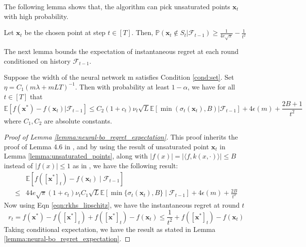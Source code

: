 The following lemma shows that, the algorithm can pick unsaturated points $\mathbf{x}_t$ with high probability. 
\begin{lemma}
\label{lemma:unsaturated_points}

Let $\mathbf{x}_t$ be the chosen point at step $t \in [T]$. Then, $\mathbb{P}(\mathbf{x}_t \not\in S_t \lvert \mathcal{F}_{t-1}) \geq \frac{1}{4e\sqrt{\pi}} - \frac{1}{t^2}$
\end{lemma}

The next lemma bounds the expectation of instantaneous regret at each round conditioned on history $\mathcal{F}_{t-1}$.

\begin{lemma}
\label{lemma:neural-bo_regret_expectation}
Suppose the width of the neural network m satisfies Condition \ref{cond:set}. Set $\eta = C_1(m\lambda + mLT)^{-1}$. Then with probability at least $1- \alpha$, we have for all $t \in [T]$ that
\begin{equation*}
\mathbb{E}[f(\mathbf{x}^*) - f(\mathbf{x}_t) \lvert \mathcal{F}_{t-1}] \leq C_2 (1+c_t)\nu_t \sqrt{L} \mathbb{E}[ \min(\sigma_t(\mathbf{x}_t),B)\lvert\mathcal{F}_{t-1}] + 4\epsilon(m) + \frac{2B+1}{t^2}
\end{equation*}
where $C_1, C_2$ are absolute constants.
\end{lemma}

\begin{proof} [Proof of Lemma \ref{lemma:neural-bo_regret_expectation}]
     
This proof inherits the proof of Lemma 4.6 in \citet{zhang2021neural}, and by using the result of unsaturated point $\mathbf{x}_t$ in Lemma \ref{lemma:unsaturated_points}, along with $\lvert f(x)  \rvert = \lvert \langle f, k(x,\cdot) \rangle \rvert \leq B$ instead of $\lvert f(x) \rvert  \leq 1$ as in \citet{zhang2021neural}, we have the following result:
\begin{equation*}
\begin{split}
    &  \mathbb{E} [f([\mathbf{x}^*]_t) - f(\mathbf{x}_t) \mid \mathcal{F}_{t-1}] \\
    \leq  & 44e\sqrt{\pi}(1+c_t )\nu_t C_1\sqrt {L} \mathbb{E}[\min \{\sigma_t(\mathbf{x}_t),B\} \mid \mathcal{F}_{t-1}] + 4\epsilon(m) + \frac{2B}{t^2}
\end{split}
\end{equation*}
Now using Eqn \ref{eqn:rkhs_lipschitz}, we have the instantaneous regret at round $t$
\[
r_t = f(\mathbf{x}^*) - f([\mathbf{x}^*]_t) + f([\mathbf{x}^*]_t) - f(\mathbf{x}_t) \leq \frac{1}{t^2} + f([\mathbf{x}^*]_t) - f(\mathbf{x}_t)
\]
Taking conditional expectation, we have the result as stated in Lemma \ref{lemma:neural-bo_regret_expectation}.

\end{proof}

